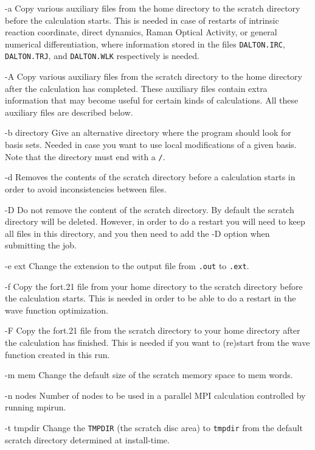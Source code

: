 \begin{list}{--}{}
\item[-a] Copy various auxiliary files from the
home directory to the scratch directory before the calculation
starts. This is needed in case of restarts of intrinsic reaction
coordinate, direct dynamics, Raman Optical Activity, or general
numerical differentiation, where information stored in the files
\verb|DALTON.IRC|, \verb|DALTON.TRJ|, and \verb|DALTON.WLK|
respectively is needed.
\item[-A] Copy various auxiliary files from
the scratch directory to the home directory after the calculation
has completed. These auxiliary files contain extra information
that may become useful for certain kinds of calculations. All
these auxiliary files are described below.
\item[-b directory] Give an alternative directory where the program
should look for basis sets. Needed in case you want to use local
modifications of a given basis. Note that the directory must end with
a \verb|/|.
\item[-d] Removes the contents of the scratch directory before a
calculation starts in order to avoid inconsistencies between files.
\item[-D] Do not remove the content of the scratch directory. By
default the scratch directory will be deleted. However, in order to do
a restart you will need to keep all files in this directory, and you
then need to add the -D option when submitting the job.
\item[-e ext] Change the extension to the output file from \verb|.out|
to \verb|.ext|.
\item[-f] Copy the fort.21
 file from your home
directory to the scratch directory before the calculation starts.
This is needed in order to be able to do a restart in the wave
function optimization.
\item[-F] Copy the fort.21
file from the
scratch directory to your home directory after the calculation has
finished. This is needed if you want to (re)start
from the wave function created in this run.
\item[-m mem] Change the default size of the scratch
memory space to
mem words.
\item[-n nodes] Number of nodes to be used in a parallel MPI calculation
controlled by running mpirun.
\item[-t tmpdir] Change the \verb|TMPDIR| (the scratch disc area) to
\verb|tmpdir| from the default scratch directory determined at
install-time.
\end{list}


